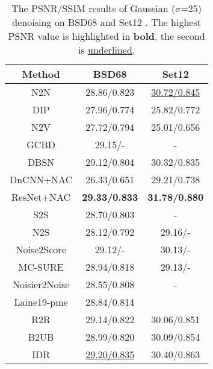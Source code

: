 \documentclass[conference]{IEEEtran}
\begin{document}
\begin{table}[t]
	\setlength{\abovecaptionskip}{0cm}
	\setlength{\belowcaptionskip}{0cm}
	\caption{The PSNR/SSIM results of Gaussian ($\sigma$=25) denoising on BSD68 \cite{roth2005fields} and Set12 \cite{dabov2007image}. The highest PSNR value is highlighted in \textbf {bold}, the second is \underline{underlined}.}
	\centering
	\begin{tabular*}{\hsize}{c@{\extracolsep{\fill}}c@{\extracolsep{\fill}}c@{\extracolsep{\fill}}}
		\hline
		Method & BSD68 & Set12 \\
		\hline
		N2N \cite{lehtinen2018noise2noise} & 28.86/0.823 & \underline{30.72/0.845}\\
		DIP \cite{ulyanov2018deep} & 27.96/0.774	&25.82/0.772\\
		N2V \cite{krull2019noise2void}	&27.72/0.794&25.01/0.656\\
		GCBD \cite{chen2018image}& 29.15/- & -	\\
		DBSN \cite{wu2020unpaired} & 29.12/0.804 & 30.32/0.835\\
		DnCNN+NAC \cite{xu2020noisy}&	26.33/0.651&	29.21/0.738\\
		ResNet+NAC \cite{xu2020noisy}&	{\bf 29.33/0.833}	&{\bf 31.78/0.880}\\
		S2S \cite{quan2020self2self}&	28.70/0.803& -	\\
		N2S \cite{batson2019noise2self}	&28.12/0.792&	29.16/-\\
		Noise2Score \cite{kim2021noise2score}&	29.12/-&	30.13/-\\
		MC-SURE\cite{ramani2008monte}	&28.94/0.818&	29.13/-\\
		Noisier2Noise \cite{moran2020noisier2noise}&	28.55/0.808	& -\\
		Laine19-pme \cite{laine2019high}	&28.84/0.814&	\\
		R2R\cite{pang2021recorrupted}	&29.14/0.822&	30.06/0.851\\
		B2UB\cite{wang2022blind2unblind}&	28.99/0.820	&30.09/0.854\\
		IDR \cite{zhang2022idr}&	\underline{29.20/0.835}	&30.40/0.863\\
		\hline
	\end{tabular*}
	\setlength{\belowcaptionskip}{-0.5cm}
	\label{tab:gray_g_25}
\vspace{-2em}
\end{table}
\end{document}
